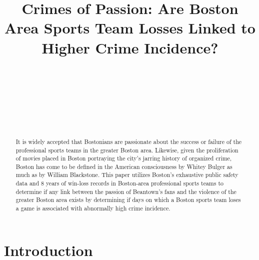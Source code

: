 \documentclass{article}
\begin{document}
\title{Crimes of Passion: Are Boston Area Sports Team Losses Linked to Higher Crime Incidence?%
%
}

\author{\\ 
\\
\\
\\
\\
\\
}

%
%

\maketitle

\begin{abstract}

It is widely accepted that Bostonians are passionate about the success or failure of the professional sports teams in the greater Boston area. Likewise, given the proliferation of movies placed in Boston portraying the city's jarring history of organized crime, Boston has come to be defined in the American consciousness by Whitey Bulger as much as by William Blackstone. This paper utilizes Boston's exhaustive public safety data and 8 years of win-loss records in Boston-area professional sports teams to determine if any link between the passion of Beantown's fans and the violence of the greater Boston area exists by determining if days on which a Boston sports team loses a game is associated with abnormally high crime incidence.
\end{abstract}


\section{Introduction}
\label{intro}
\end{document}
